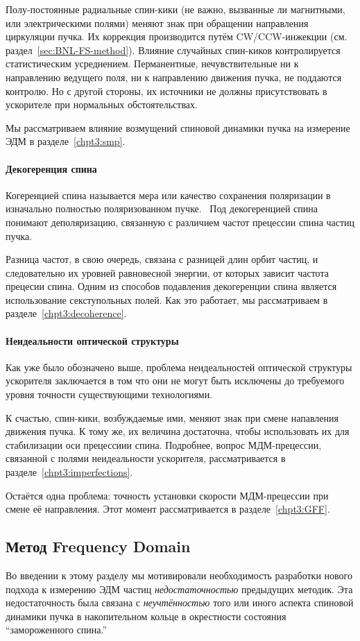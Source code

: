 Полу-постоянные радиальные спин-кики (не важно, вызванные ли магнитными, или электрическими полями) 
меняют знак при обращении направления циркуляции пучка. Их коррекция производится путём
CW/CCW-инжекции (см. раздел~\ref{sec:BNL-FS-method}). Влияние случайных спин-киков контролируется
статистическим усреднением. Перманентные, нечувствительные ни к направлению ведущего поля, ни к направлению
движения пучка, не поддаются контролю. Но с другой стороны, их источники не должны присутствовать в ускорителе
при нормальных обстоятельствах. 

Мы рассматриваем влияние возмущений спиновой динамики пучка на измерение
ЭДМ в разделе~\ref{chpt3:smp}.

\paragraph{Декогеренция спина}
Когеренцией спина называется мера или качество сохранения поляризации
в изначально полностью поляризованном пучке.~\cite[стр.~205]{Eremey:Thesis}
Под декогеренцией спина понимают деполяризацию, связанную с различием частот прецессии спина
частиц пучка. 

Разница частот, в свою очередь, связана с разницей длин орбит частиц, и следовательно
их уровней равновесной энергии, от которых зависит частота прецесии спина. 
Одним из способов подавления декогеренции спина является использование секступольных полей. 
Как это работает, мы рассматриваем в разделе~\ref{chpt3:decoherence}.

\paragraph{Неидеальности оптической структуры}
Как уже было обозначено выше, проблема неидеальностей оптической структуры ускорителя 
заключается в том что они не могут быть исключены до требуемого уровня точности 
существующими технологиями.

К счастью, спин-кики, возбуждаемые ими, меняют знак при смене напавления движения пучка. К тому же,
их величина достаточна, чтобы использовать их для стабилизации оси прецессиии спина.
Подробнее, вопрос МДМ-прецессии, связанной с полями неидеальности ускорителя, рассматривается в
 разделе~\ref{chpt3:imperfections}.

Остаётся одна проблема: точность установки скорости МДМ-прецессии при смене её направления. 
Этот момент рассматривается в разделе~\ref{chpt3:GFF}.

\subsection{Метод Frequency Domain}\label{sec:FDM_concept}
Во введении к этому разделу мы мотивировали необходимость разработки нового подхода к измерению
ЭДМ частиц \emph{недостаточностью} предыдущих методик. Эта недостаточность была связана с 
\emph{неучтённостью} того или иного аспекта спиновой динамики пучка в накопительном кольце 
в окрестности состояния ``замороженного спина.''

